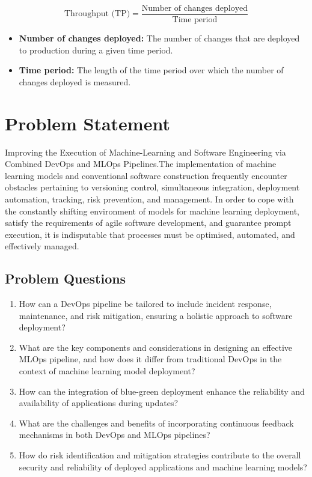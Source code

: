\documentclass[12pt, letterpaper]{article}
\begin{document}
\begin{equation}
\text{Throughput (TP)} = \frac{\text{Number of changes deployed}}{\text{Time period}}
\end{equation}

\begin{itemize}
\item \textbf{Number of changes deployed:} The number of changes that are deployed to production during a given time period.
\item \textbf{Time period:} The length of the time period over which the number of changes deployed is measured.
\end{itemize}




\section{Problem Statement}
Improving the Execution of Machine-Learning and Software Engineering via Combined DevOps and MLOps Pipelines.The implementation of machine learning models and conventional software construction frequently encounter obstacles pertaining to versioning control, simultaneous integration, deployment automation, tracking, risk prevention, and management\cite{elKhalyly}. In order to cope with the constantly shifting environment of models for machine learning deployment, satisfy the requirements of agile software development, and guarantee prompt execution, it is indisputable that processes must be optimised, automated, and effectively managed.

\subsection{Problem Questions}
\begin{enumerate}
    \item How can a DevOps pipeline be tailored to include incident response, maintenance, and risk mitigation, ensuring a holistic approach to software deployment?
    \item What are the key components and considerations in designing an effective MLOps pipeline, and how does it differ from traditional DevOps in the context of machine learning model deployment?
    \item How can the integration of blue-green deployment enhance the reliability and availability of applications during updates?
    \item What are the challenges and benefits of incorporating continuous feedback mechanisms in both DevOps and MLOps pipelines?
    \item How do risk identification and mitigation strategies contribute to the overall security and reliability of deployed applications and machine learning models?
\end{enumerate}
\end{document}
